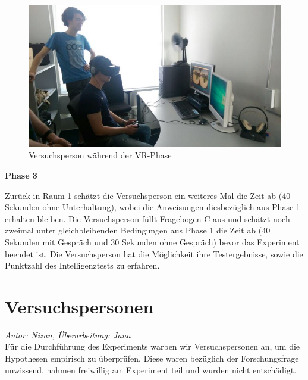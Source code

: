 \documentclass{Bericht}
\begin{document}
\begin{figure}[H]
	\centering    
	\includegraphics[height=\textheight, width=\linewidth, keepaspectratio]{../Bilder/v.jpg}
	\caption{Versuchsperson während der VR-Phase}
	\label{img:versuchsperson-in-vr}
\end{figure}

\textbf{Phase 3}

Zurück in Raum 1 schätzt die Versuchsperson ein weiteres Mal die Zeit ab (40 Sekunden ohne Unterhaltung), wobei die Anweisungen diesbezüglich aus Phase 1 erhalten bleiben. Die Versuchsperson füllt Fragebogen C aus und schätzt noch zweimal unter gleichbleibenden Bedingungen aus Phase 1 die Zeit ab (40 Sekunden mit Gespräch und 30 Sekunden ohne Gespräch) bevor das Experiment beendet ist. Die Versuchsperson hat die Möglichkeit ihre Testergebnisse, sowie die Punktzahl des Intelligenztests zu erfahren.


	\section{Versuchspersonen}
	\textit{Autor: Nizan, Überarbeitung: Jana}\\
Für die Durchführung des Experiments warben wir Versuchspersonen an, um die Hypothesen empirisch zu überprüfen. 
Diese waren bezüglich der Forschungsfrage unwissend, nahmen freiwillig am Experiment teil und wurden nicht entschädigt. 
\end{document}
